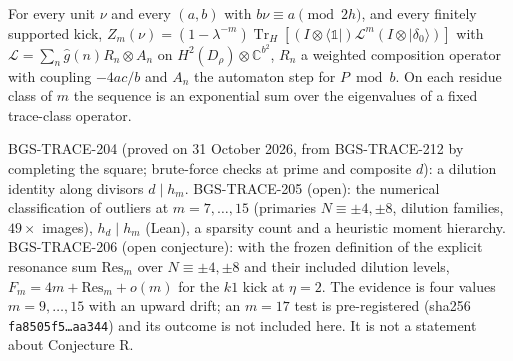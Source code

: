 \begin{theorem}
For every unit \(\nu\) and every \((a,b)\) with \(b\nu\equiv a\pmod{2h}\), and every finitely supported kick, \(Z_m(\nu)=(1-\lambda^{-m})\operatorname{Tr}_H[(I\otimes\langle\mathbb 1\rvert)\mathcal L^m(I\otimes\lvert\delta_0\rangle)]\) with \(\mathcal L=\sum_n\hat g(n)R_n\otimes A_n\) on \(H^2(D_\rho)\otimes\mathbb C^{b^2}\), \(R_n\) a weighted composition operator with coupling \(-4ac/b\) and \(A_n\) the automaton step for \(P\bmod b\). On each residue class of \(m\) the sequence is an exponential sum over the eigenvalues of a fixed trace-class operator.
\end{theorem}

\begin{remark}
BGS-TRACE-204 (proved on 31 October 2026, from BGS-TRACE-212 by completing the square; brute-force checks at prime and composite \(d\)): a dilution identity along divisors \(d\mid h_m\).
BGS-TRACE-205 (open): the numerical classification of outliers at \(m=7,\dots,15\) (primaries \(N\equiv\pm4,\pm8\), dilution families, \(49\times\) images), \(h_d\mid h_m\) (Lean), a sparsity count and a heuristic moment hierarchy.
BGS-TRACE-206 (open conjecture): with the frozen definition of the explicit resonance sum \(\mathrm{Res}_m\) over \(N\equiv\pm4,\pm8\) and their included dilution levels, \(F_m=4m+\mathrm{Res}_m+o(m)\) for the \(k1\) kick at \(\eta=2\). The evidence is four values \(m=9,\dots,15\) with an upward drift; an \(m=17\) test is pre-registered (sha256 \texttt{fa8505f5\dots aa344}) and its outcome is not included here. It is not a statement about Conjecture R.
\end{remark}
